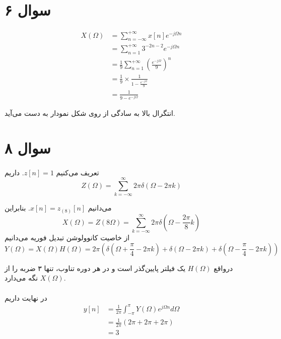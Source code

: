 \documentclass{article}
\begin{document}
	\section*{سوال ۶}

	\begin{align*}
		X(\Omega) &= \sum_{n=-\infty}^{+\infty} x[n]e^{-j\Omega n} \\
		&= \sum_{n=1}^{+\infty} 3^{-2n-2}e^{-j\Omega n} \\
		&= \frac{1}{9} \sum_{n=1}^{+\infty} \left(\frac{e^{-j\Omega}}{9}\right)^n \\
		&= \frac{1}{9} \times \frac{1}{1-\frac{e^{-j\Omega}}{9}} \\
		&= \frac{1}{9-e^{-j\Omega}}
	\end{align*}

	انتگرال بالا به سادگی از روی شکل نمودار به دست می‌آید.

	\section*{سوال ۸}
	\paragraph*{}
	تعریف می‌کنیم
	$z[n] = 1$.
	داریم
	\begin{equation*}
		Z(\Omega) = \sum_{k=-\infty}^{\infty} 2\pi \delta(\Omega-2\pi k)
	\end{equation*}

	می‌دانیم
	$x[n] = z_{(8)}[n]$.
	بنابراین
	\begin{equation*}
		X(\Omega) = Z(8\Omega) = \sum_{k=-\infty}^{\infty} 2\pi \delta(\Omega-\frac{2\pi}{8} k)
	\end{equation*}
	از خاصیت کانوولوشن تبدیل فوریه می‌دانیم
	\begin{equation*}
		Y(\Omega) = X(\Omega)H(\Omega) = 2\pi \left(\delta(\Omega + \frac{\pi}{4} - 2\pi k) + \delta(\Omega - 2\pi k) + \delta(\Omega - \frac{\pi}{4}  - 2\pi k)\right)
	\end{equation*}

	درواقع
	$H(\Omega)$
	یک فیلتر پایین‌گذر است و در هر دوره تناوب، تنها ۳ ضربه را از
	$X(\Omega)$
	نگه می‌دارد.

	\paragraph*{}
	در نهایت داریم
	\begin{align*}
		y[n] &= \frac{1}{2\pi} \int_{-\pi}^{\pi} Y(\Omega) e^{j\Omega n} d\Omega \\
		&= \frac{1}{2\pi} (2\pi + 2\pi + 2\pi) \\
		&= 3
	\end{align*}
\end{document}
